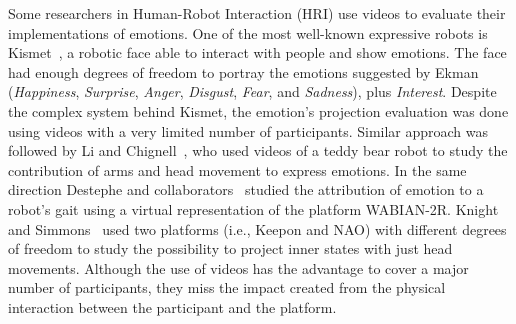 Some researchers in Human-Robot Interaction (HRI) use videos to evaluate their implementations of emotions. One of the most well-known expressive robots is Kismet~\cite{Breazeal2002}, a robotic face able to interact with people and show emotions. The face had enough degrees of freedom to portray the emotions suggested by Ekman~\cite{Ekman2004} (\textit{Happiness}, \textit{Surprise}, \textit{Anger}, \textit{Disgust}, \textit{Fear}, and \textit{Sadness}), plus \textit{Interest}. 
Despite the complex system behind Kismet, the emotion's projection evaluation was done using videos with a very limited number of participants. Similar approach was followed by Li and Chignell~\cite{Li2011}, who used videos of a teddy bear robot to study the contribution of arms and head movement to express emotions. In the same direction Destephe and collaborators~\cite{Destephe2013} studied the attribution of emotion to a robot's gait using a virtual representation of the platform WABIAN-2R. Knight and Simmons~\cite{knight2016} used two platforms (i.e., Keepon and NAO) with different degrees of freedom to study the possibility to project inner states with just head movements. Although the use of videos has the advantage to cover a major number of participants, they miss the impact created from the physical interaction between the participant and the platform.

